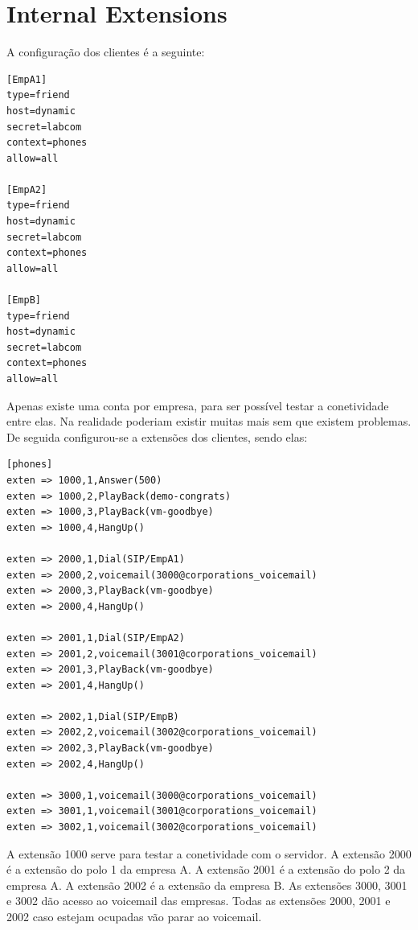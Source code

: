 \documentclass[11pt,a4paper]{report}
\begin{document}
\section{Internal Extensions}

A configuração dos clientes é a seguinte:

\begin{lstlisting}[caption=SIP Proxy 1 - /etc/asterisk/sip.conf]
[EmpA1]
type=friend
host=dynamic
secret=labcom
context=phones
allow=all

[EmpA2]
type=friend
host=dynamic
secret=labcom
context=phones
allow=all

[EmpB]
type=friend
host=dynamic
secret=labcom
context=phones
allow=all
\end{lstlisting}

Apenas existe uma conta por empresa, para ser possível testar a conetividade entre elas. Na realidade poderiam existir muitas mais sem que existem problemas.\\

De seguida configurou-se a extensões dos clientes, sendo elas:

\begin{lstlisting}[caption=SIP Proxy 1 - /etc/asterisk/extensions.conf]
[phones]
exten => 1000,1,Answer(500)
exten => 1000,2,PlayBack(demo-congrats)
exten => 1000,3,PlayBack(vm-goodbye)
exten => 1000,4,HangUp()

exten => 2000,1,Dial(SIP/EmpA1)
exten => 2000,2,voicemail(3000@corporations_voicemail)
exten => 2000,3,PlayBack(vm-goodbye)
exten => 2000,4,HangUp()

exten => 2001,1,Dial(SIP/EmpA2)
exten => 2001,2,voicemail(3001@corporations_voicemail)
exten => 2001,3,PlayBack(vm-goodbye)
exten => 2001,4,HangUp()

exten => 2002,1,Dial(SIP/EmpB)
exten => 2002,2,voicemail(3002@corporations_voicemail)
exten => 2002,3,PlayBack(vm-goodbye)
exten => 2002,4,HangUp()

exten => 3000,1,voicemail(3000@corporations_voicemail)
exten => 3001,1,voicemail(3001@corporations_voicemail)
exten => 3002,1,voicemail(3002@corporations_voicemail)
\end{lstlisting}

A extensão 1000 serve para testar a conetividade com o servidor. 
A extensão 2000 é a extensão do polo 1 da empresa A. 
A extensão 2001 é a extensão do polo 2 da empresa A. 
A extensão 2002 é a extensão da empresa B. 
As extensões 3000, 3001 e 3002 dão acesso ao voicemail das empresas.
Todas as extensões 2000, 2001 e 2002 caso estejam ocupadas vão parar ao voicemail.\\
\end{document}
